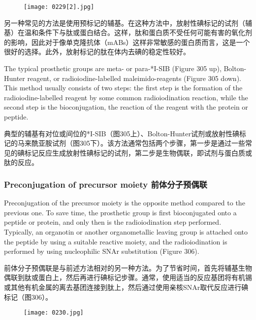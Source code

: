 \documentclass[dvipsnames, svgnames,a4paper,11pt]{article}
\begin{document}
\begin{figure}[h]
	\centering
    \texttt{[image: 0229[2].jpg]}  
     \label{fig305}
\end{figure}

另一种常见的方法是使用预标记的辅基。在这种方法中，放射性碘标记的试剂（辅基）在温和条件下与肽或蛋白结合。这样，肽和蛋白质不受任何可能有害的氧化剂的影响，因此对于像单克隆抗体（mABs）这样非常敏感的蛋白质而言，这是一个很好的选择。此外，放射标记的肽在体内去碘的稳定性较好。  

The typical prosthetic groups are meta- or para-*I-SIB (Figure 305 up), Bolton-Hunter reagent, or radioiodine-labelled maleimido-reagents (Figure 305 down). This method usually consists of two steps: the first step is the formation of the radioiodine-labelled reagent by some common radioiodination reaction, while the second step is the bioconjugation, the reaction of the reagent with the protein or peptide.  



典型的辅基有对位或间位的*I-SIB（图305上）、Bolton-Hunter试剂或放射性碘标记的马来酰亚胺试剂（图305下）。该方法通常包括两个步骤，第一步是通过一些常见的碘标记反应生成放射性碘标记的试剂，第二步是生物偶联，即试剂与蛋白质或肽的反应。  

\subsubsection{Preconjugation of precursor moiety 前体分子预偶联}  
Preconjugation of the precursor moiety is the opposite method compared to the previous one. To save time, the prosthetic group is first bioconjugated onto a peptide or protein, and only then is the radioiodination step performed. Typically, an organotin or another organometallic leaving group is attached onto the peptide by using a suitable reactive moiety, and the radioiodination is performed by using nucleophilic SNAr substitution (Figure 306).  

前体分子预偶联是与前述方法相对的另一种方法。为了节省时间，首先将辅基生物偶联到肽或蛋白上，然后再进行碘标记步骤。通常，使用适当的反应基团将有机锡或其他有机金属的离去基团连接到肽上，然后通过使用亲核SNAr取代反应进行碘标记（图306）。  

\begin{figure}[h]
	\centering
    \texttt{[image: 0230.jpg]}  
     \label{fig306}
\end{figure}
\end{document}

